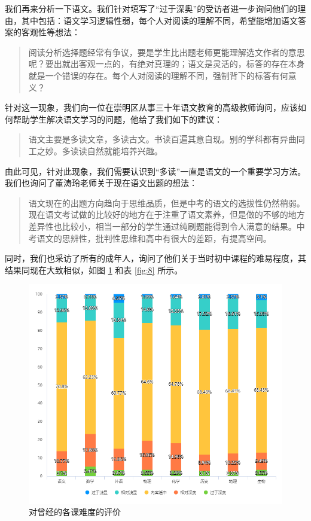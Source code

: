 \documentclass[12pt,UTF8]{ctexart}
\begin{document}
\par {
	
	我们再来分析一下语文。我们针对填写了“过于深奥”的受访者进一步询问他们的理由，其中包括：语文学习逻辑性弱，每个人对阅读的理解不同，希望能增加语文答案的客观性等想法：
	\begin{quote}
		\kaishu
		阅读分析选择题经常有争议，要是学生比出题老师更能理解选文作者的意思呢？要出就出客观一点的，有绝对真理的；语文是灵活的，标答的存在本身就是一个错误的存在。每个人对阅读的理解不同，强制背下的标答有何意义？
	\end{quote}
}
\par {
	针对这一现象，我们向一位在崇明区从事三十年语文教育的高级教师询问，应该如何帮助学生解决语文学习的问题，他给了我们如下的建议：
	\begin{quote}
		\kaishu 语文主要是多读文章，多读古文。书读百遍其意自现。别的学科都有异曲同工之妙。多读读自然就能培养兴趣。
	\end{quote}
	由此可见，针对此现象，我们需要认识到“多读”一直是语文的一个重要学习方法。
	我们也询问了董涛玲老师关于现在语文出题的想法：
	\begin{quote}
		\kaishu
		语文现在的出题方向趋向于思维品质，但是中考的语文的选拔性仍然稍弱。现在语文考试做的比较好的地方在于注重了语文素养，但是做的不够的地方差异性也比较小，相当一部分的学生通过纯刷题能得到令人满意的结果。中考语文的思辨性，批判性思维和高中有很大的差距，有提高空间。
	\end{quote}
}
\par {
	同时，我们也采访了所有的成年人，询问了他们关于当时初中课程的难易程度，其结果同现在大致相似，如图 \ref{fig:7} 和表 \ref{fig:8} 所示。
	
}
\begin{figure}[!htb]
	\centering
	\includegraphics[width=4.6in]{chart/7.png}
	\caption{对曾经的各课难度的评价}
	\label{fig:7}
\end{figure}
\end{document}
